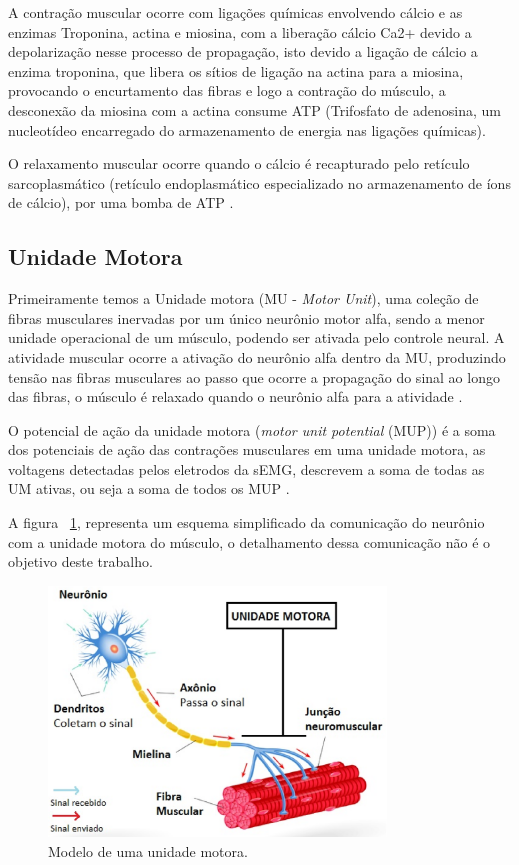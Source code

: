 A contração muscular ocorre com ligações químicas envolvendo cálcio e as enzimas Troponina, actina e miosina, com a liberação cálcio Ca2+ devido a depolarização nesse processo de propagação, isto devido a ligação de cálcio a enzima troponina, que libera os sítios de ligação na actina para a miosina, provocando o encurtamento das fibras e logo a contração do músculo, a desconexão da miosina com a actina consume ATP (Trifosfato de adenosina, um nucleotídeo encarregado do armazenamento de energia nas ligações químicas)\cite{da2005detecccao}. 

O relaxamento muscular ocorre quando o cálcio é recapturado pelo retículo sarcoplasmático (retículo endoplasmático especializado no armazenamento de íons de cálcio), por uma bomba de ATP \cite{da2005detecccao}. 

\subsection{Unidade Motora}
Primeiramente temos a Unidade motora (MU - \textit{Motor Unit}), uma coleção de fibras musculares inervadas por um único neurônio motor alfa, sendo a menor unidade operacional de um músculo, podendo ser ativada pelo controle neural. A atividade muscular ocorre a ativação do neurônio alfa dentro da MU, produzindo tensão nas fibras musculares ao passo que ocorre a propagação do sinal ao longo das fibras, o músculo é relaxado quando o neurônio alfa para a atividade \cite{yousefi2014characterizing}.

O potencial de ação da unidade motora (\textit{motor unit potential} (MUP)) é a soma dos potenciais de ação das contrações musculares em uma unidade motora, as voltagens detectadas pelos eletrodos da sEMG, descrevem a soma de todas as UM ativas, ou seja a soma de todos os MUP \cite{yousefi2014characterizing}.

A figura ~\ref{UnidadeMotora}, representa um esquema simplificado da comunicação do neurônio com a unidade motora do músculo, o detalhamento dessa comunicação não é o objetivo deste trabalho.

\begin{figure}[!htb]
   \centering
    \includegraphics[width=0.8\textwidth]{figuras/motor-neuron.eps}
    \caption{Modelo de uma unidade motora.}
    \label{UnidadeMotora}
\end{figure}

